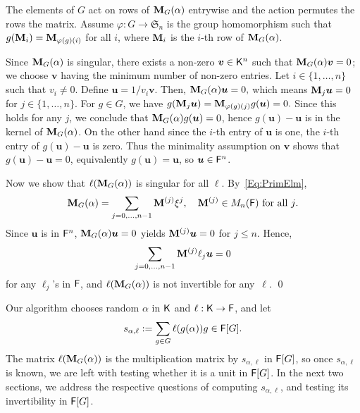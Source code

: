   The elements of $G$ act on rows of $\mat M_G(\alpha)$ entrywise and the
  action permutes the rows the matrix. Assume
  $\varphi : G \to \mathfrak{S}_n$ is the group homomorphism such that
  $g(\mat M_i) = \mat M_{\varphi(g)(i)}$ for all $i$, where $\mat M_i$ is
  the $i$-th row of $\mat M_G(\alpha)$.
  
  Since $\mat M_G(\alpha)$ is singular, there exists a non-zero
  $\boldsymbol{v} \in {\mathsf{K}}^n$ such that $\mat M_G(\alpha)\boldsymbol{v} = 0$;
  we choose $\boldsymbol{v}$ having the minimum number of non-zero
  entries. Let $i \in \lbrace 1, \ldots , n \rbrace$ such that
  $v_i \neq 0$. Define $\boldsymbol{u} = 1/v_i\boldsymbol{v}$. Then,
  $\mat M_G(\alpha)\boldsymbol{u} = 0,$ which means
  $\mat M_j \boldsymbol{u} = 0 $ for $j \in \lbrace 1, \ldots, n
  \rbrace$. For $g \in G$, we have
  $g(\mat M_j \boldsymbol{u}) = \mat M_{\varphi(g)(j)} g(\boldsymbol{u})=
  0.$ Since this holds for any $j$, we conclude that
  $\mat M_G(\alpha)g(\boldsymbol{u})= 0$, hence
  $g(\boldsymbol{u})-\boldsymbol{u}$ is in the kernel of
  $\mat M_G(\alpha)$. On the other hand since the $i$-th entry of
  $\boldsymbol{u}$ is one, the $i$-th entry of
  $g(\boldsymbol{u}) -\boldsymbol{u}$ is zero. Thus the minimality
  assumption on $\textbf{v}$ shows that
  $g(\boldsymbol{u}) -\boldsymbol{u} = 0$, equivalently
  $g(\boldsymbol{u})=\boldsymbol{u}$, so $\boldsymbol{u} \in {\mathsf{F}}^n$.
  
  Now we show that $\ell(\mat M_G(\alpha))$ is singular for all $\ell$. By~\eqref{Eq:PrimElm}, 
  $$\mat M_G(\alpha) = \sum_{j = 0,\dots,n-1} \mat M^{(j)} \xbar^j, \quad 
  \mat M^{(j)} \in M_{n}(\F) \text{~for all $j$}.$$ 
  Since $\boldsymbol{u}$ is in ${\mathsf{F}}^n$,
  $\mat M_G(\alpha) \boldsymbol{u} =0$ yields
  $\mat M^{(j)}\boldsymbol{u} = 0$ for $j \le n$. Hence,
$$\sum_{j = 0,\dots,n-1} \mat M^{(j)} \ell_j \boldsymbol{u} = 0$$ for any 
$\ell_j$'s in ${\mathsf{F}}$, and $\ell(\mat M_G(\alpha))$ is not invertible for any~$\ell$.
\hfill \qed

Our algorithm  chooses random
$\alpha$ in ${\mathsf{K}}$ and $\ell: {\mathsf{K}}\to{\mathsf{F}}$, and let
\begin{equation}\label{def:s_alpha_ell}
s_{\alpha,\ell}:=\sum_{g \in G} \ell(g(\alpha))g \in {\mathsf{F}}[G].  
\end{equation}
 The
matrix $\ell(\mat M_G (\alpha))$ is the multiplication matrix by
$s_{\alpha,\ell}$ in ${\mathsf{F}}[G]$, so once $s_{\alpha,\ell}$ is known, we
are left with testing whether it is a unit in ${\mathsf{F}}[G]$.  In the next
two sections, we address the respective questions of computing
$s_{\alpha,\ell}$, and testing its invertibility in ${\mathsf{F}}[G]$.


